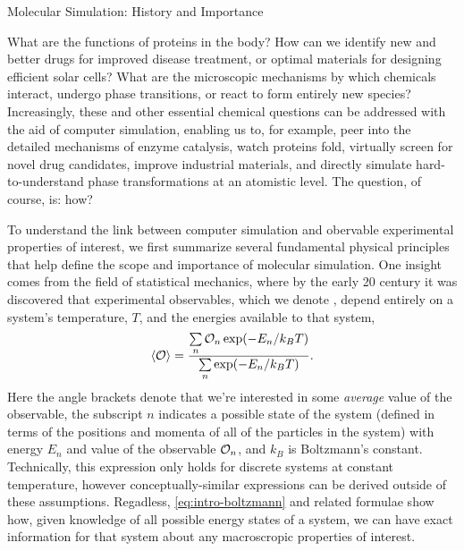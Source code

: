 \begin{section}{Molecular Simulation: History and Importance}

What are the functions of proteins in the body? How can we identify new and better drugs for improved
disease treatment, or optimal materials for designing efficient solar cells?
What are the microscopic mechanisms by which chemicals interact, undergo phase
transitions, or react to form entirely new species? Increasingly, these and other 
essential chemical questions can be addressed with the aid of computer
simulation, 
\cite{VanGunsteren1990,Hospital2015,Chen2015,Karplus2002,Ciccotti2014}
enabling us to, for example, peer into the detailed mechanisms of enzyme catalysis,
\cite{Warshel2003}
watch proteins fold,
\cite{Levitt1975,Lane2013,Piana2014,Perez2016}
virtually screen for novel drug candidates, 
\cite{DeVivo2016}
improve industrial materials,
\cite{Jiang2011,Maurin2016,Bereau2016}
and directly simulate hard-to-understand phase transformations at an atomistic level.
\cite{Kalikmanov2013,Wilding2001}
The question, of course, is: how?


To understand the link between computer simulation and obervable experimental properties
of interest,\footnotemark{} we first summarize several fundamental
physical principles
that help define the
scope and importance of molecular simulation.
One insight comes from the field of
statistical mechanics, where by the early 20 century it was discovered
that experimental observables, which we denote \obs, depend entirely on
a system's temperature, $T$, and the energies available to that system,
%
\begin{align}
\label{eq:intro-boltzmann}
\braket{\mathcal{O}} = \frac{\sum\limits_n \mathcal{O}_n \exp (-E_n/k_BT)}
                    {\sum\limits_n \exp (-E_n/k_BT)}.
\end{align}
%
Here the angle brackets denote that we're interested in some \emph{average}
value of the observable, the subscript $n$ indicates a possible state of the
system (defined in terms of the positions and momenta of all of the particles
in the system) with energy $E_n$ and value of the observable
$\mathcal{O}_n$, 
and $k_B$ is Boltzmann's constant.\cite{allen1989computer}
 Technically,
this expression only holds for discrete systems at constant temperature,
however conceptually-similar expressions can be derived outside of these
assumptions. 
Regadless, \cref{eq:intro-boltzmann} and related formulae show how, 
given knowledge of all possible energy states of a system, we can
have exact information for that system about any macroscropic properties of
interest. 


\end{section}
